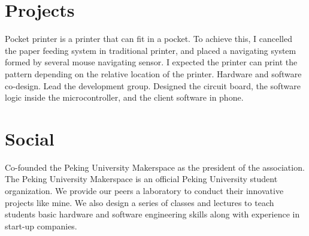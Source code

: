 \documentclass[]{deedy-resume-openfont}
\begin{document}
\begin{minipage}[t]{0.62\textwidth}

\section{Projects}
\descript{}
Pocket printer is a printer that can fit in a pocket. To achieve this, I cancelled the paper feeding system in traditional printer, and placed a navigating system formed by several mouse navigating sensor. I expected the printer can print the pattern depending on the relative location of the printer.
Hardware and software co-design. Lead the development group. Designed the circuit board, the software logic inside the microcontroller, and the client software in phone.
\sectionsep


\section{Social}
Co-founded the Peking University Makerspace as the president of the association. The Peking University Makerspace is an official Peking University student organization. We provide our peers a laboratory to conduct their innovative projects like mine. We also design a series of classes and lectures to teach students basic hardware and software engineering skills along with experience in start-up companies.





\end{minipage} 
\end{document}

